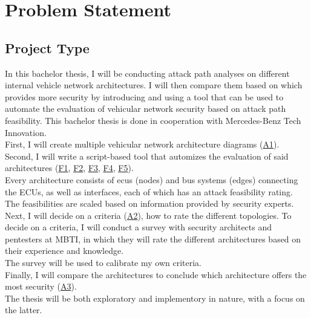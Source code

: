 
\chapter{Problem Statement}
\label{sec:problem}

\section{Project Type}\label{sec:type}

In this bachelor thesis, I will be conducting attack path analyses on different internal vehicle network architectures.
I will then compare them based on which provides more security by introducing and using a tool that can be used to automate the evaluation of vehicular network security based on \gls{attack path} feasibility.
This bachelor thesis is done in cooperation with Mercedes-Benz Tech Innovation.\\

First, I will create multiple vehicular network architecture diagrams (\hyperref[sec:a1]{A1}).\\
Second, I will write a script-based tool that automizes the evaluation of said architectures
(\hyperref[sec:f1]{F1},
\hyperref[sec:f2]{F2},
\hyperref[sec:f3]{F3},
\hyperref[sec:f4]{F4},
\hyperref[sec:f5]{F5}).\\
Every architecture consists of \gls{ecu}s (nodes) and bus systems (edges) connecting the ECUs, as well as interfaces, each of which has an attack feasibility rating.
The feasibilities are scaled based on information provided by security experts.\\

Next, I will decide on a criteria (\hyperref[sec:a2]{A2}), how to rate the different topologies.
To decide on a criteria, I will conduct a survey with security architects and pentesters at MBTI, in which they will rate the different architectures based on their experience and knowledge.\\
The survey will be used to calibrate my own criteria.\\

Finally, I will compare the architectures to conclude which architecture offers the most security (\hyperref[sec:a3]{A3}).\\

The thesis will be both exploratory and implementory in nature, with a focus on the latter.



